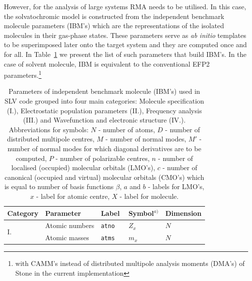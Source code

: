 \documentclass[b5paper,oneside,fleqn,11pt]{book}
\begin{document}
\begin{refsection}
However, for the analysis of large systems RMA needs 
to be utilised. In this case, the solvatochromic model is constructed 
from the independent benchmark molecule parameters (IBM's)
which are the representations of the isolated molecules in their gas\hyp{}phase states.
These parameters serve as \emph{ab initio} templates to be superimposed later onto
the target system and they are computed once and for all.
In Table~\ref{t:slv-rma-parameters}
we present the list of such parameters that
build IBM's. In the case of solvent molecule,
IBM is equivalent to the conventional EFP2 parameters.\footnote{with 
CAMM's instead of distributed multipole analysis moments
(DMA's) of Stone \citep{Stone.JCTC.2005} in the current implementation}
%
\begin{landscape}
\begin{longtable}{ p{} p{} p{} p{} p{} }
\caption{
 Parameters of independent benchmark molecule (IBM's) used in SLV code grouped
 into four main categories: Molecule specification (I.), Electrostatic population
 parameters (II.), Frequency analysis (III.) and Wavefunction and electronic structure (IV.).
 Abbreviations for symbols: $N$ - number of atoms, $D$ - number of distributed multipole centres,
 $M$ - number of normal modes, $M'$ - number of normal modes for which diagonal derivatives
 are to be computed, $P$ - number of polarizable centres, $n$ - number of localised (occupied) molecular
 orbitals (LMO's), $c$ - number of canonical (occupied and virtual) molecular orbitals (CMO's) which is equal to
 number of basis functions $\beta$, $a$ and $b$ - labels for LMO's, $x$ - label for atomic centre, 
 $X$ - label for molecule.
\label{t:slv-rma-parameters}}
\\\hline\hline
 Category   & Parameter & Label & Symbol$^{a)}$ & Dimension \\
\hline
\multirow{3}{*}{I.}
&Atomic numbers                         &\tt{atno    } &   $Z_x$                                     &      $N$                                 \\                                        
&Atomic masses                          &\tt{atms    } &   $m_x$                                     &      $N$                                 \\

\end{longtable}
\end{landscape}
\end{refsection}
\end{document}
